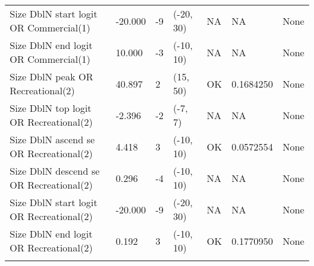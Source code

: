 \documentclass[11pt,
  english,
  a4paper,
]{article}
\begin{document}
\begin{landscape}
\begin{longtable}[t]{>{\raggedright\arraybackslash}p{6cm}lllll>{\raggedright\arraybackslash}p{4cm}}
Size DblN start logit OR Commercial(1) & -20.000 & -9 & (-20, 30) & NA & NA & None\\
Size DblN end logit OR Commercial(1) & 10.000 & -3 & (-10, 10) & NA & NA & None\\
Size DblN peak OR Recreational(2) & 40.897 & 2 & (15, 50) & OK & 0.1684250 & None\\
Size DblN top logit OR Recreational(2) & -2.396 & -2 & (-7, 7) & NA & NA & None\\
Size DblN ascend se OR Recreational(2) & 4.418 & 3 & (-10, 10) & OK & 0.0572554 & None\\
Size DblN descend se OR Recreational(2) & 0.296 & -4 & (-10, 10) & NA & NA & None\\
Size DblN start logit OR Recreational(2) & -20.000 & -9 & (-20, 30) & NA & NA & None\\
Size DblN end logit OR Recreational(2) & 0.192 & 3 & (-10, 10) & OK & 0.1770950 & None\\*
\end{longtable}
\leavevmode\tagmcend\tagstructend\par
\endgroup{}
\end{landscape}
\endgroup{}





\newpage



\newpage



\newpage

\begingroup\fontsize{10}{12}\selectfont
\begingroup\fontsize{10}{12}\selectfont
\end{document}
